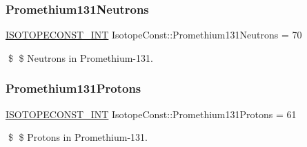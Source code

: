 \subsubsection{\texorpdfstring{Promethium131\+Neutrons}{Promethium131Neutrons}}
{\footnotesize\ttfamily \mbox{\hyperlink{group___isotope_const-_macros_ga5f18360b3e99483a35c32d789e62621c}{I\+S\+O\+T\+O\+P\+E\+C\+O\+N\+S\+T\+\_\+\+I\+NT}} Isotope\+Const\+::\+Promethium131\+Neutrons = 70}

\$ \$ Neutrons in Promethium-\/131. \mbox{\label{group___isotope_const-_promethium-_pm131_gadc130f65ae750d5a501b772200443f53}} 
\subsubsection{\texorpdfstring{Promethium131\+Protons}{Promethium131Protons}}
{\footnotesize\ttfamily \mbox{\hyperlink{group___isotope_const-_macros_ga5f18360b3e99483a35c32d789e62621c}{I\+S\+O\+T\+O\+P\+E\+C\+O\+N\+S\+T\+\_\+\+I\+NT}} Isotope\+Const\+::\+Promethium131\+Protons = 61}

\$ \$ Protons in Promethium-\/131. 